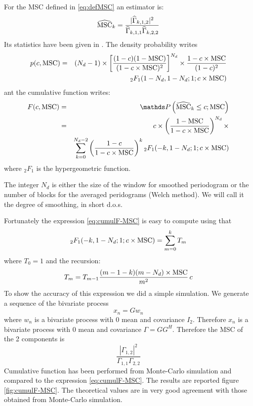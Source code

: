 For the MSC defined in \eqref{eq:defMSC} an estimator is:
\begin{eqnarray}
\label{eq:MSCestimate}
 \widehat{\mathrm{MSC}}_{k}= \frac{|\widehat\Gamma_{k,1,2}|^{2}}{\widehat\Gamma_{k,1,1}\widehat\Gamma_{k,2,2}}
\end{eqnarray}
Its statistics have been given in \cite{carter:1973}. The density probability writes
\begin{eqnarray}
\label{eq:pdf-MSC}
p(c,\mathrm{MSC})
 &=&\nonumber
 (N_{d}-1)\times \left[
 \frac{(1-c)(1-\mathrm{MSC})}{(1-c\times\mathrm{MSC})^{2}}
 \right]^{N_{d}}\times\frac{1-c\times\mathrm{MSC}}{(1-c)^{2}}
 \\
 &&{}_{2}F_{1}(1-N_{d},1-N_{d};1;c\times\mathrm{MSC})
\end{eqnarray}
ant the cumulative function writes:
\begin{eqnarray}
\label{eq:cumulF-MSC}
F(c,\MSC)
 &=& \nonumber
\prob{\hMSC_{k}\leq c;\MSC}
\\
 &=&\nonumber
 c \times \left(
 \frac{1-\MSC}{1-c\times\MSC}
 \right)^{N_{d}} \times
  \\
 &&
 \sum_{k=0}^{N_{d}-2}\left(\frac{1-c}{1-c\times\MSC}\right)^{k}
  {}_{2}F_{1}(-k,1-N_{d};1;c\times\MSC)
\end{eqnarray}
where ${}_{2}F_{1}$ is the hypergeometric function.

The integer $N_{d}$ is either the size of the window for smoothed periodogram or the number of blocks for the averaged peridograms (Welch method). We will call it the  degree of smoothing, in short d.o.s.

Fortunately the expression \eqref{eq:cumulF-MSC} is easy to compute using that
$$
 {}_{2}F_{1}(-k,1-N_{d};1;c\times\mathrm{MSC})=\sum_{m=0}^{k}T_{m}
$$ 
where $T_{0}=1$ and the recursion:
\begin{eqnarray}
\label{eq:Trecursion}
T_{m} = T_{m-1}\frac{(m-1-k)(m-N_{d})\times\mathrm{MSC}}{m^{2}}\,c
\end{eqnarray}
To show the accuracy of this expression we did a simple simulation. We generate a sequence of the bivariate process
$$
 x_{n} = Gw_{n}
$$
where $w_{n}$ is a bivariate process with 0 mean and covariance $I_{2}$. Therefore $x_{n}$ is a bivariate process with 0 mean  and covariance $\Gamma=GG^{H}$. Therefore the MSC of the 2 components is
$$
 \frac{|\Gamma_{1,2}|^{2}}{\Gamma_{1,1}\Gamma_{2,2}}
$$
Cumulative function has been performed from Monte-Carlo simulation and compared to the expression
\eqref{eq:cumulF-MSC}. The results are reported figure \ref{fig:cumulF-MSC}. The theoretical values are in very good agreement with those obtained from Monte-Carlo simulation. 

